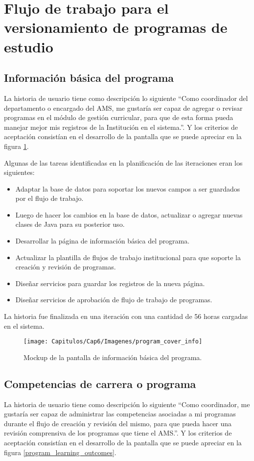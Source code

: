 \section{Flujo de trabajo para el versionamiento de programas de estudio}
\subsection{Información básica del programa}
La historia de usuario tiene como descripción lo siguiente \enquote{Como coordinador del departamento o encargado del AMS, me gustaría ser capaz de agregar o revisar programas en el módulo de gestión curricular, para que de esta forma pueda manejar mejor mis registros de la Institución en el sistema.}. Y los criterios de aceptación consistían en el desarrollo de la pantalla que se puede apreciar en la figura \ref{program_cover_info}.

Algunas de las tareas identificadas en la planificación de las iteraciones eran los siguientes:
\begin{itemize}
	\item Adaptar la base de datos para soportar los nuevos campos a ser guardados por el flujo de trabajo.
	\item Luego de hacer los cambios en la base de datos, actualizar o agregar nuevas clases de Java para su posterior uso.
	\item Desarrollar la página de información básica del programa.
	\item Actualizar la plantilla de flujos de trabajo institucional para que soporte la creación y revisión de programas.
	\item Diseñar servicios para guardar los registros de la nueva página.
	\item Diseñar servicios de aprobación de flujo de trabajo de programas.
\end{itemize}

La historia fue finalizada en una iteración con una cantidad de 56 horas cargadas en el sistema.

\begin{figure}[H]
\centering
\texttt{[image: Capitulos/Cap6/Imagenes/program\_cover\_info]}
\caption{Mockup de la pantalla de información básica del programa.}
  \label{program_cover_info}
\end{figure}

\subsection{Competencias de carrera o programa}
La historia de usuario tiene como descripción lo siguiente \enquote{Como coordinador, me gustaría ser capaz de administrar las competencias asociadas a mi programas durante el flujo de creación y revisión del mismo, para que pueda hacer una revisión comprensiva de los programas que tiene el AMS.}. Y los criterios de aceptación consistían en el desarrollo de la pantalla que se puede apreciar en la figura \ref{program_learning_outcomes}.

